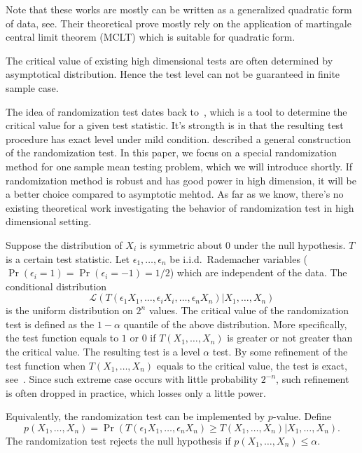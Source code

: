 \documentclass[review]{elsarticle}
\theoremstyle{plain}
\theoremstyle{definition}
\theoremstyle{remark}
\begin{document}
Note that these works are mostly can be written as a generalized quadratic form of data, see.
Their theoretical prove mostly rely on the application of martingale central limit theorem (MCLT) which is suitable for quadratic form.

The critical value of existing high dimensional tests are often determined by asymptotical distribution. Hence the test level can not be guaranteed in finite sample case.




The idea of randomization test dates back to~\cite{Fisher}, which is a tool to determine the critical value for a given test statistic.
It's strongth is in that the resulting test procedure has exact level under mild condition.
\cite{Romano1990On} described a general construction of the randomization test.
In this paper, we focus on a special randomization method for one sample mean testing problem, which we will introduce shortly.
If randomization method is robust and has good power in high dimension, it will be a better choice compared to asymptotic mehtod.
As far as we know, there's no existing theoretical work investigating the behavior of randomization test in high dimensional setting.

Suppose the distribution of $X_i$ is symmetric about $0$ under the null hypothesis. $T$ is a certain test statistic.
Let $\epsilon_1,\ldots,\epsilon_n$ be i.i.d.\ Rademacher variables ($\Pr(\epsilon_i=1)=\Pr(\epsilon_i=-1)=1/2$) which are independent of the data.
The conditional distribution
\begin{equation}\label{ranDis}
    \mathcal{L}(T(\epsilon_1 X_1,\ldots,\epsilon_i X_i,\ldots,\epsilon_n X_n)|X_1,\ldots,X_n)
\end{equation}
is the uniform distribution on $2^n$ values.
The critical value of the randomization test is defined as the $1-\alpha$ quantile of the above distribution.
 More specifically, the test function equals to $1$ or $0$ if $T(X_1,\ldots, X_n)$ is greater or not greater than the critical value. The resulting test is a level $\alpha$ test.
 By some refinement of the test function when $T(X_1,\ldots,X_n)$ equals to the critical value, the test is exact, see~\cite{Romano1990On}.
Since such extreme case occurs with little probability $2^{-n}$, such refinement is often dropped in practice, which losses only a little power.

Equivalently, the randomization test can be implemented by $p$-value. Define 
\begin{equation*}
    p(X_1,\ldots, X_n)=
    \Pr(T(\epsilon_1 X_1,\ldots,\epsilon_n X_n)\geq T( X_1,\ldots,X_n)|X_1,\ldots,X_n).
\end{equation*}
The randomization test rejects the null hypothesis if $p(X_1,\ldots, X_n)\leq \alpha$. 
\end{document}
